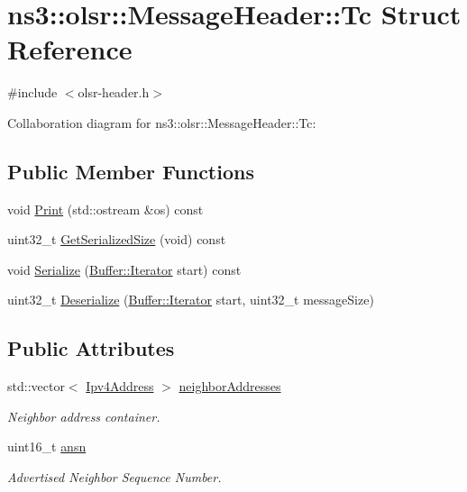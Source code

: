 \hypertarget{structns3_1_1olsr_1_1MessageHeader_1_1Tc}{}\section{ns3\+:\+:olsr\+:\+:Message\+Header\+:\+:Tc Struct Reference}
\label{structns3_1_1olsr_1_1MessageHeader_1_1Tc}


{\ttfamily \#include $<$olsr-\/header.\+h$>$}



Collaboration diagram for ns3\+:\+:olsr\+:\+:Message\+Header\+:\+:Tc\+:
\subsection*{Public Member Functions}
\begin{DoxyCompactItemize}
\item 
void \hyperlink{structns3_1_1olsr_1_1MessageHeader_1_1Tc_a9793c70b09fd5059487997b90d724c7a}{Print} (std\+::ostream \&os) const 
\item 
uint32\+\_\+t \hyperlink{structns3_1_1olsr_1_1MessageHeader_1_1Tc_a0372fa0477f907c0681e92cb3dce6eee}{Get\+Serialized\+Size} (void) const 
\item 
void \hyperlink{structns3_1_1olsr_1_1MessageHeader_1_1Tc_afcbf30f5bf303dc4689b84f62704f7b9}{Serialize} (\hyperlink{classns3_1_1Buffer_1_1Iterator}{Buffer\+::\+Iterator} start) const 
\item 
uint32\+\_\+t \hyperlink{structns3_1_1olsr_1_1MessageHeader_1_1Tc_adbdd723f030f40d3978966f6f985a7be}{Deserialize} (\hyperlink{classns3_1_1Buffer_1_1Iterator}{Buffer\+::\+Iterator} start, uint32\+\_\+t message\+Size)
\end{DoxyCompactItemize}
\subsection*{Public Attributes}
\begin{DoxyCompactItemize}
\item 
std\+::vector$<$ \hyperlink{classns3_1_1Ipv4Address}{Ipv4\+Address} $>$ \hyperlink{structns3_1_1olsr_1_1MessageHeader_1_1Tc_a236424f611929db7d7f154f8c31c970e}{neighbor\+Addresses}
\begin{DoxyCompactList}\small\item\em Neighbor address container. \end{DoxyCompactList}\item 
uint16\+\_\+t \hyperlink{structns3_1_1olsr_1_1MessageHeader_1_1Tc_a0f74e45f855b1b500fb950336ef4aa63}{ansn}
\begin{DoxyCompactList}\small\item\em Advertised Neighbor Sequence Number. \end{DoxyCompactList}\end{DoxyCompactItemize}


